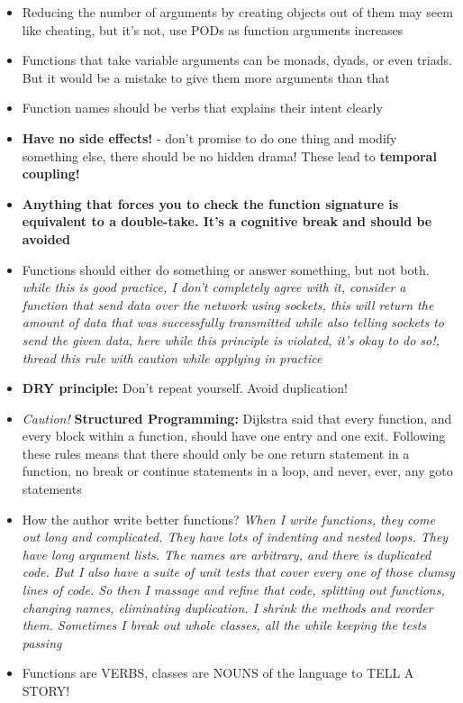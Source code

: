 \documentclass[14pt]{article}
\begin{document}
\begin{itemize}
	\item Reducing the number of arguments by creating objects out of them may seem like cheating, but it’s not, use PODs as function arguments increases
	\item Functions that take variable arguments can be monads, dyads, or even triads. But it would be a mistake to give them more arguments than that
	\item Function names should be verbs that explains their intent clearly
	\item \textbf{Have no side effects!} - don't promise to do one thing and modify something else, there should be no hidden drama! These lead to \textbf{temporal coupling!}
	\item \textbf{Anything that forces you to check the function signature is equivalent to a double-take. It’s a cognitive break and should be avoided}
	\item Functions should either do something or answer something, but not both. \textit{while this is good practice, I don't completely agree with it, consider a function that send data over the network using sockets, this will return the amount of data that was successfully transmitted while also telling sockets to send the given data, here while this principle is violated, it's okay to do so!, thread this rule with caution while applying in practice}
	\item \textbf{DRY principle:} Don't repeat yourself. Avoid duplication!
	\item \textit{Caution!} \textbf{Structured Programming:} Dijkstra said that every function, and every block within a function, should have one entry and one exit. Following these rules means that there should only be one return statement in a function, no break or continue statements in a loop, and never, ever, any goto statements
	\item How the author write better functions? \textit{When I write functions, they come out long and complicated. They have lots of indenting and nested loops. They have long argument lists. The names are arbitrary, and there is duplicated code. But I also have a suite of unit tests that cover every one of those clumsy lines of code. So then I massage and refine that code, splitting out functions, changing names, eliminating duplication. I shrink the methods and reorder them. Sometimes I break out whole classes, all the while keeping the tests passing}
	\item Functions are VERBS, classes are NOUNS of the language to TELL A STORY!

\end{itemize}
\end{document}
